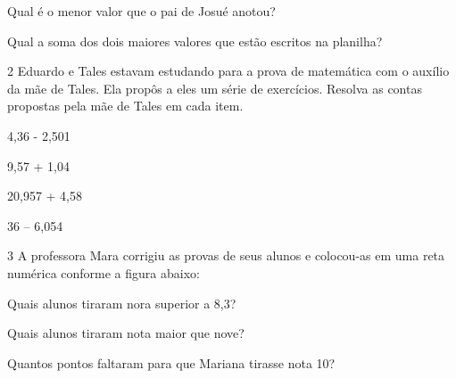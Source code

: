 {\begin{escolha}

\item
  Qual é o menor valor que o pai de Josué anotou?


\item
  Qual a soma dos dois maiores valores que estão escritos na planilha?

\end{escolha}


\num{2} Eduardo e Tales estavam estudando para a prova de matemática com o
auxílio da mãe de Tales. Ela propôs a eles um série de exercícios.
Resolva as contas propostas pela mãe de Tales em cada item.

\begin{escolha}
\item
  4,36 - 2,501


\item
  9,57 + 1,04


\item
  20,957 + 4,58


\item
  36 -- 6,054

\end{escolha}


\num{3} A professora Mara corrigiu as provas de seus alunos e colocou-as em
uma reta numérica conforme a figura abaixo:


\begin{escolha}
\item
  Quais alunos tiraram nora superior a 8,3?


\item
  Quais alunos tiraram nota maior que nove?


\item
  Quantos pontos faltaram para que Mariana tirasse nota 10?

\end{escolha}

}
